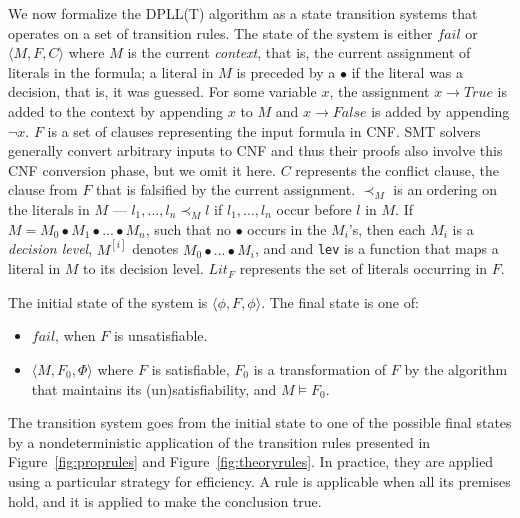 \documentclass{article}
\begin{document}
	We now formalize the DPLL(T) algorithm 
	as a state transition systems that 
	operates on a set of transition rules. 
	The state of the system is either 
	$fail$ or $\langle M, F, C \rangle$ 
	where $M$ is the current 
	\textit{context}, that is, 
	the current assignment of literals in 
	the formula; a literal in $M$ is 
	preceded by a $\bullet$ if the literal 
	was a decision, that is, it was 
	guessed. For some variable $x$, 
	the assignment $x \to True$ is added 
	to the context by appending $x$ to 
	$M$ and $x \to False$ is added by 
	appending $\neg x$. $F$ is a set of 
	clauses representing the input formula 
	in CNF. SMT solvers generally convert 
	arbitrary inputs to CNF and thus 
	their proofs also involve this CNF
	conversion phase, but we omit it here.
	$C$ represents the conflict 
	clause, the clause from $F$ that is 
	falsified by the current assignment. 
	$\prec_M$ is an ordering 
	on the literals in $M$ ---
	$l_1, ..., l_n \prec_M l$ if 
	$l_1, ..., l_n$ occur before 
	$l$ in $M$. If $M = M_0 
	\bullet M_1 \bullet ... \bullet M_n$, 
	such that no $\bullet$ occurs in 
	the $M_i$'s, then each $M_i$ is a
	\textit{decision level}, $M^{[i]}$ 
	denotes $M_0 \bullet ... \bullet M_i$,
	and and \texttt{lev} is a function 
	that maps a literal in $M$ to its 
	decision level. $Lit_F$ represents the 
	set of literals occurring in $F$.
	
	The initial state of the system is 
	$\langle \phi, F, \phi \rangle$. 
	The final state is one of:
	\begin{itemize}
		\item $fail$, when $F$ is 
		unsatisfiable.
		\item $\langle M, F_0, \Phi \rangle$ 
		where $F$ is satisfiable, $F_0$ is 
		a transformation of $F$ by the 
		algorithm that maintains its 
		(un)satisfiability,	and $M 
		\models F_0$.
	\end{itemize}
	
	The transition system goes from the 
	initial state to one of the possible 
	final states by a nondeterministic 
	application of the transition rules 
	presented in Figure~\ref{fig:proprules} 
	and Figure~\ref{fig:theoryrules}. In 
	practice, they are applied using a 
	particular strategy for efficiency.
	A rule is applicable when all its 
	premises hold, and it is applied to 
	make the conclusion true. 
\end{document}
